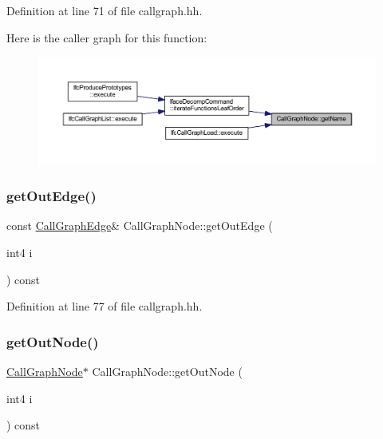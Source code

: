 Definition at line 71 of file callgraph.\+hh.

Here is the caller graph for this function\+:
\nopagebreak
\begin{figure}[H]
\begin{center}
\leavevmode
\includegraphics[width=350pt]{class_call_graph_node_a2277f2f032877d1f0251e5bdb6c4b32a_icgraph}
\end{center}
\end{figure}
\mbox{\label{class_call_graph_node_af4e36e64c9990d6e77a8858217429676}} 
\subsubsection{\texorpdfstring{getOutEdge()}{getOutEdge()}}
{\footnotesize\ttfamily const \mbox{\hyperlink{class_call_graph_edge}{Call\+Graph\+Edge}}\& Call\+Graph\+Node\+::get\+Out\+Edge (\begin{DoxyParamCaption}\item[{int4}]{i }\end{DoxyParamCaption}) const\hspace{0.3cm}{\ttfamily [inline]}}



Definition at line 77 of file callgraph.\+hh.

\mbox{\label{class_call_graph_node_aa3cdd86912417b09815e2a6c478f6ff2}} 
\subsubsection{\texorpdfstring{getOutNode()}{getOutNode()}}
{\footnotesize\ttfamily \mbox{\hyperlink{class_call_graph_node}{Call\+Graph\+Node}}$\ast$ Call\+Graph\+Node\+::get\+Out\+Node (\begin{DoxyParamCaption}\item[{int4}]{i }\end{DoxyParamCaption}) const\hspace{0.3cm}{\ttfamily [inline]}}



